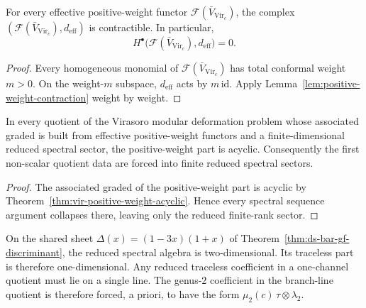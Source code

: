 \begin{theorem}
\label{thm:vir-positive-weight-acyclic}
For every effective positive-weight functor
\(\mathcal F(\bar V_{\mathrm{Vir}_c})\), the complex
\((\mathcal F(\bar V_{\mathrm{Vir}_c}),d_{\mathrm{eff}})\) is
contractible. In particular,
\[
H^\bullet\bigl(\mathcal F(\bar V_{\mathrm{Vir}_c}),d_{\mathrm{eff}}\bigr)=0.
\]
\end{theorem}

\begin{proof}
Every homogeneous monomial of
\(\mathcal F(\bar V_{\mathrm{Vir}_c})\) has total conformal weight
\(m>0\). On the weight-\(m\) subspace,
\(d_{\mathrm{eff}}\) acts by \(m\,\mathrm{id}\). Apply
Lemma~\ref{lem:positive-weight-contraction} weight by weight.
\end{proof}

\begin{corollary}
\label{cor:vir-localization-reduced-spectral}
In every quotient of the Virasoro modular deformation problem whose
associated graded is built from effective positive-weight functors and a
finite-dimensional reduced spectral sector, the positive-weight part is
acyclic. Consequently the first non-scalar quotient data are forced into
finite reduced spectral sectors.
\end{corollary}

\begin{proof}
The associated graded of the positive-weight part is acyclic by
Theorem~\ref{thm:vir-positive-weight-acyclic}. Hence every spectral
sequence argument collapses there, leaving only the reduced finite-rank
sector.
\end{proof}

\begin{remark}
\label{rem:reduced-line-shared-sheet}
On the shared sheet
\(\Delta(x)=(1-3x)(1+x)\) of
Theorem~\ref{thm:ds-bar-gf-discriminant}, the reduced spectral algebra
is two-dimensional. Its traceless part is therefore one-dimensional.
Any reduced traceless coefficient in a one-channel quotient must lie on a
single line. The genus-\(2\) coefficient in the branch-line quotient is
therefore forced, a priori, to have the form
\(\mu_2(c)\,\tau\otimes \lambda_2\).
\end{remark}

